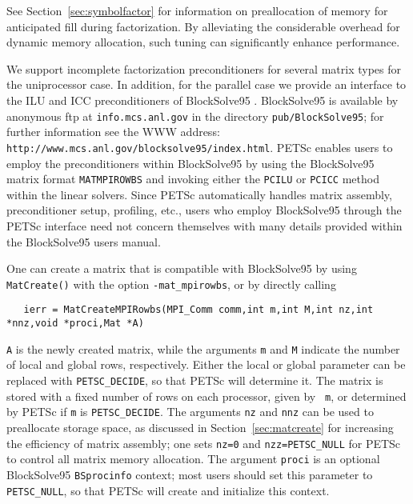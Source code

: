 See Section~\ref{sec:symbolfactor} for information on preallocation
of memory for anticipated fill during factorization.
By alleviating the considerable overhead for dynamic memory allocation,
such tuning can significantly enhance performance.

We support incomplete factorization preconditioners for several matrix
types for the uniprocessor case.  In addition, for the parallel case
we provide an interface to the ILU and ICC preconditioners
of BlockSolve95 \cite{bs-user-ref}.  BlockSolve95 
is available by anonymous ftp at {\tt info.mcs.anl.gov} in the directory
{\tt pub/BlockSolve95}; for further information see the WWW address: {\tt
http://www.mcs.anl.gov/blocksolve95/index.html}.  PETSc enables users
to employ the preconditioners within
BlockSolve95 by using the BlockSolve95 matrix format {\tt MATMPIROWBS}
and invoking either the {\tt PCILU} or {\tt PCICC} method within the linear
solvers.  Since PETSc automatically handles matrix assembly,
preconditioner setup, profiling, etc., users who employ BlockSolve95
through the PETSc interface need not concern themselves with many
details provided within the BlockSolve95 users manual.

One can create a matrix that is compatible with BlockSolve95 by using
{\tt MatCreate()} with the option {\tt -mat\_mpirowbs}, or by directly
calling 
\begin{verbatim}
   ierr = MatCreateMPIRowbs(MPI_Comm comm,int m,int M,int nz,int *nnz,void *proci,Mat *A)
\end{verbatim}
{\tt A} is the newly created matrix, while the arguments {\tt m} and
{\tt M} indicate the number of local and global rows,
respectively. Either the local or global parameter can be replaced
with {\tt PETSC\_DECIDE}, so that PETSc will determine it.  The matrix
is stored with a fixed number of rows on each processor, given by {\tt
m}, or determined by PETSc if {\tt m} is {\tt PETSC\_DECIDE}.  The
arguments {\tt nz} and {\tt nnz} can be used to preallocate storage
space, as discussed in Section~\ref{sec:matcreate} for increasing
the efficiency of matrix assembly; one sets {\tt nz=0} and
{\tt nzz=PETSC\_NULL} for PETSc to control all matrix memory
allocation.  The argument {\tt proci} is an optional BlockSolve95
{\tt BSprocinfo} context; most users should set this parameter to 
{\tt PETSC\_NULL}, so that PETSc will create and initialize this context.


